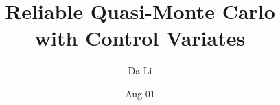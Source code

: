 \documentclass{iitthesis}
\begin{document}
\title{Reliable Quasi-Monte Carlo\\
   with Control Variates}
\author{Da Li}
\date{Aug 01}
\maketitle                %

\prelimpages         %

%

\tableofcontents
\clearpage

\listoftables

\clearpage

\listoffigures

\clearpage

%




\textpages     %

%
%

\clearpage

{}

\end{document}
